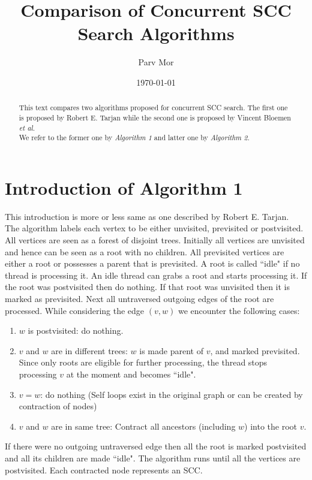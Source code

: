 \documentclass[a4paper]{article}
\title{Comparison of Concurrent SCC Search Algorithms}
\author{Parv Mor}
\affil{Indian Institute of Technology, Kanpur}
\date{\today}
\begin{document}
\maketitle

\begin{abstract}
This text compares two algorithms proposed for concurrent SCC search. The first one is proposed by Robert E. Tarjan while the second one is proposed by Vincent Bloemen \textit{et al.}~\cite{bloemen}\\
We refer to the former one by \textit{Algorithm 1} and latter one by \textit{Algorithm 2}.
\end{abstract}

\section{Introduction of Algorithm 1}
\label{sec:intro1}

This introduction is more or less same as one described by Robert E. Tarjan. \\

The algorithm labels each vertex to be either unvisited, previsited or postvisited.
All vertices are seen as a forest of disjoint trees.
Initially all vertices are unvisited and hence can be seen as a root with no children.
All previsited vertices are either a root or possesses a parent that is previsited.
A root is called ``idle" if no thread is processing it.
An idle thread can grabs a root and starts processing it.
If the root was postvisited then do nothing.
If that root was unvisited then it is marked as previsited.
Next all untraversed outgoing edges of the root are processed.
While considering the edge $(v, w)$ we encounter the following cases:
\begin{enumerate}
    \item $w$ is postvisited: do nothing.
    \item $v$ and $w$ are in different trees: $w$ is made parent of $v$, and marked previsited. Since only roots are eligible for further processing, the thread stops processing $v$ at the moment and becomes ``idle".
    \item $v = w$: do nothing (Self loops exist in the original graph or can be created by contraction of nodes)
    \item $v$ and $w$ are in same tree: Contract all ancestors (including $w$) into the root $v$.
\end{enumerate}
If there were no outgoing untraversed edge then all the root is marked postvisited and all its children are made ``idle".
The algorithm runs until all the vertices are postvisited. Each contracted node represents an SCC.
\end{document}
